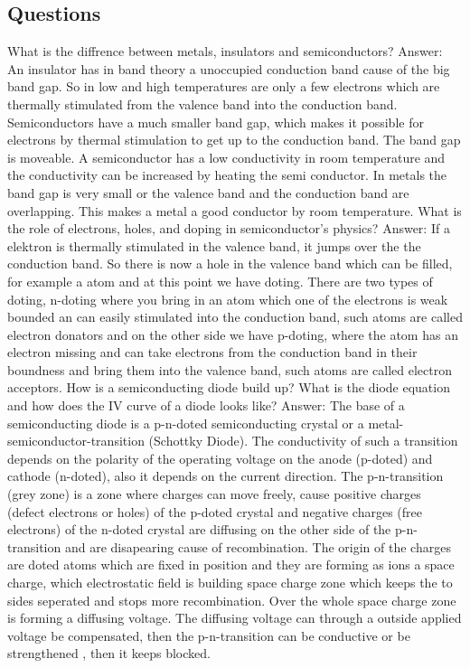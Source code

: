 \documentclass[a4paper, 12pt]{scrartcl}
\begin{document}
\subsection{Questions} 
What is the diffrence between metals, insulators and semiconductors? 
\newline 
\newline 
Answer: An insulator has in band theory a unoccupied conduction band cause of the big band gap. So in low and high temperatures are only a few electrons which are thermally stimulated from the valence band into the conduction band. Semiconductors have a much smaller band gap, which makes it possible for electrons by thermal stimulation to get up to the conduction band. The band gap is moveable. A semiconductor has a low conductivity in room temperature and the conductivity can be increased by heating the semi conductor. In metals the band gap is very small or the valence band and the conduction band are overlapping. This makes a metal a good conductor by room temperature. 
\newline 
\newline 
What is the role of electrons, holes, and doping in semiconductor’s physics? 
\newline 
\newline 
Answer: If a elektron is thermally stimulated in the valence band, it jumps over the the conduction band. So there is now a hole in the valence band which can be filled, for example a atom and at this point we have doting. There are two types of doting, n-doting where you bring in an atom which one of the electrons is weak bounded an can easily stimulated into the conduction band, such atoms are called electron donators and on the other side we have p-doting, where the atom has an electron missing and can take electrons from the conduction band in their boundness and bring them into the valence band, such atoms are called electron acceptors. 
\newline 
\newline 
How is a semiconducting diode build up? What is the diode equation and how does the
IV curve of a diode looks like?
\newline 
\newline 
Answer: The base of a semiconducting diode is a p-n-doted semiconducting crystal or a metal-semiconductor-transition (Schottky Diode). The conductivity of such a transition depends on the polarity of the operating voltage on the anode (p-doted) and cathode (n-doted), also it depends on the current direction. The p-n-transition (grey zone) is a zone where charges can move freely, cause positive charges (defect electrons or holes) of the p-doted crystal and negative charges (free electrons) of the n-doted crystal are diffusing on the other side of the p-n-transition and are disapearing cause of recombination. The origin of the charges are doted atoms which are fixed in position and they are forming as ions a space charge, which electrostatic field is building space charge zone which keeps the to sides seperated and stops more recombination. Over the whole space charge zone is forming a diffusing voltage. The diffusing voltage can through a outside applied voltage be compensated, then the p-n-transition can be conductive or be strengthened , then it keeps blocked.
\end{document}
